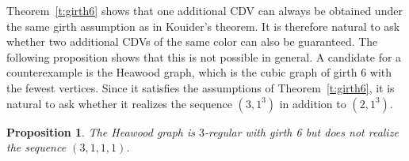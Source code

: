 \documentclass{article}
\newtheorem{proposition}[theorem]{Proposition}
\theoremstyle{definition}
\begin{document}
\medskip

Theorem~\ref{t:girth6} shows that one additional CDV can always be obtained under the same girth assumption as in Kouider's theorem. It is therefore natural to ask whether two additional CDVs of the same color can also be guaranteed. The following proposition shows that this is not possible in general. A candidate for a counterexample is the Heawood graph, which is the cubic graph of girth $6$ with the fewest vertices.
Since it satisfies the assumptions of Theorem~\ref{t:girth6}, it is natural to ask whether it realizes the sequence $(3,1^3)$ in addition to $(2,1^3)$.

\begin{proposition}\label{p:Heawood}
The Heawood graph is $3$-regular with girth 6 but does not realize the sequence $(3,1,1,1)$. 
\end{proposition}
\end{document}
